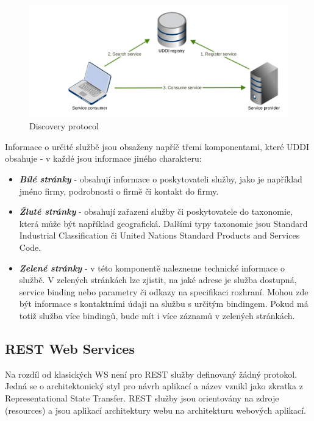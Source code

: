 \documentclass[11pt,twoside,a4paper]{book}
\begin{document}
\begin{figure}[h]
\begin{center}
\includegraphics[width=13cm]{images-pdf/uddi.pdf} 
\caption{Discovery protocol}
\label{fig:logo}
\end{center}
\end{figure}

Informace o určité službě jsou obsaženy napříč třemi komponentami, které UDDI obsahuje -
v každé jsou informace jiného charakteru:

\begin{itemize}
  \item \textbf{\textit{Bílé stránky}} - obsahují informace o
  poskytovateli služby, jako je například jméno firmy, podrobnosti o firmě či kontakt do firmy.

  \item \textbf{\textit{Žluté stránky}} - obsahují zařazení služby
  či poskytovatele do taxonomie, která může být například geografická. Dalšími typy taxonomie jsou Standard Industrial
Classification či United Nations Standard Products and Services Code.

  \item \textbf{\textit{Zelené stránky}} - v této komponentě
  nalezneme technické informace o službě. V zelených stránkách lze zjistit, na jaké adrese je služba dostupná, service binding nebo
parametry či odkazy na specifikaci rozhraní. Mohou zde být informace s kontaktními
údaji na službu s určitým bindingem. Pokud má totiž služba více bindingů, bude mít i
více záznamů v zelených stránkách.

\end{itemize}

\subsection{REST Web Services}

Na rozdíl od klasických WS není pro REST služby definovaný žádný protokol. Jedná
se o architektonický styl pro návrh aplikací a název vznikl jako zkratka z  Representational State Transfer. REST služby jsou orientovány na zdroje (resources) a jsou aplikací architektury webu na architekturu webových aplikací. 
\end{document}
